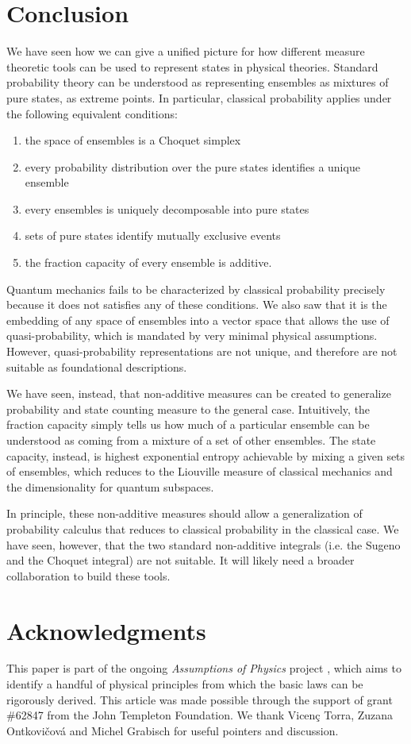 \documentclass[10pt,twocolumn, nofootinbib]{revtex4-2}
\begin{document}
\section{Conclusion}

We have seen how we can give a unified picture for how different measure theoretic tools can be used to represent states in physical theories. Standard probability theory can be understood as representing ensembles as mixtures of pure states, as extreme points. In particular, classical probability applies under the following equivalent conditions:
\begin{enumerate}
	\item the space of ensembles is a Choquet simplex
	\item every probability distribution over the pure states identifies a unique ensemble
	\item every ensembles is uniquely decomposable into pure states
	\item sets of pure states identify mutually exclusive events
	\item the fraction capacity of every ensemble is additive.
\end{enumerate}
Quantum mechanics fails to be characterized by classical probability precisely because it does not satisfies any of these conditions. We also saw that it is the embedding of any space of ensembles into a vector space that allows the use of quasi-probability, which is mandated by very minimal physical assumptions. However, quasi-probability representations are not unique, and therefore are not suitable as foundational descriptions.

We have seen, instead, that non-additive measures can be created to generalize probability and state counting measure to the general case. Intuitively, the fraction capacity simply tells us how much of a particular ensemble can be understood as coming from a mixture of a set of other ensembles. The state capacity, instead, is highest exponential entropy achievable by mixing a given sets of ensembles, which reduces to the Liouville measure of classical mechanics and the dimensionality for quantum subspaces.

In principle, these non-additive measures should allow a generalization of probability calculus that reduces to classical probability in the classical case. We have seen, however, that the two standard non-additive integrals (i.e. the Sugeno and the Choquet integral) are not suitable. It will likely need a broader collaboration to build these tools.


\section*{Acknowledgments}
This paper is part of the ongoing \textit{Assumptions of Physics} project \cite{aop-book}, which aims to identify a handful of physical principles from which the basic laws can be rigorously derived. This article was made possible through the support of grant \#62847 from the John Templeton Foundation. We thank Vicen\c{c} Torra, Zuzana Ontkovi\v{c}ov\'{a} and Michel Grabisch for useful pointers and discussion.




\newcommand{\pj}[1] {\underbar{$#1$}}
\end{document}
